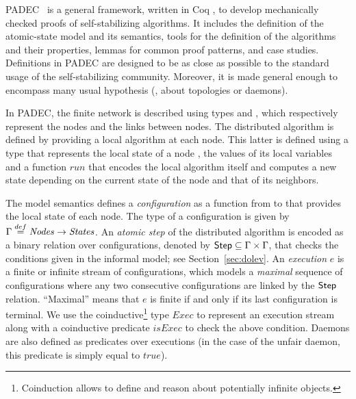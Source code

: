 PADEC~\cite{ACD7} is a general framework, written in
Coq \cite{coqart}, to develop mechanically checked proofs of
self-stabilizing algorithms.  It includes the definition of the
atomic-state model and its semantics, tools for the definition of the
algorithms and their properties, lemmas for common proof patterns, and
case studies.  Definitions in PADEC are designed to be as close as
possible to the standard usage of the self-stabilizing community.
Moreover, it is made general enough to encompass many usual hypothesis
(\eg, about topologies or daemons).

In PADEC, the finite network is described using types \Nodes
and \Channels, 
which respectively represent the nodes and the links between nodes.
The distributed algorithm is defined by providing a local
algorithm at each node. This latter is defined using a type
\States 
that represents the local state of a node
\ie, the values of its local variables and a function $\mathit{run}$
that encodes the local algorithm itself and computes a new state
depending on the current state of the node and that of its neighbors.

The model semantics defines a \emph{configuration} as a function
from \Nodes to \States that provides the local state of each node.
The type of a configuration is given by
$\Gamma \stackrel{def}= \mathit{Nodes} \rightarrow \mathit{States}$.  An \emph{atomic step} of
the distributed algorithm is encoded as a binary relation over
configurations, denoted by $\mathsf{Step} \subseteq \Gamma \times \Gamma$, that
checks the conditions given in the informal model; see
Section~\ref{sec:dolev}.  An \emph{execution} $e$
is a finite or infinite stream of configurations, which models a
\emph{maximal} sequence of configurations where any two consecutive
configurations are linked by the $\mathsf{Step}$ relation.  ``Maximal'' means
that $e$ is finite if and only if its last configuration is
terminal. We use the coinductive\footnote{Coinduction allows to define
and reason about potentially infinite objects.}  type $\mathit{Exec}$
to represent an execution stream along with a coinductive predicate
$\mathit{isExec}$
to check the above condition.
Daemons are also defined as predicates over executions (in the case of
the unfair daemon, this predicate is simply equal
to $\mathit{true}$).

